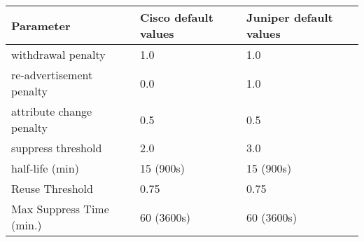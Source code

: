 \begin{center}
	\begin{tabular}{ || m{5cm} | m{4cm} | m{4cm} || }
	\hline
			Parameter & Cisco default values & Juniper default values\\
	\hline \hline
			withdrawal penalty & 1.0 & 1.0 \\
	\hline
			re-advertisement penalty & 0.0 & 1.0 \\
	\hline
			attribute change penalty & 0.5 & 0.5 \\
	\hline
			suppress threshold & 2.0 & 3.0\\
	\hline
			half-life (min) & 15 (900s) & 15 (900s)\\
	\hline
			Reuse Threshold & 0.75 & 0.75 \\
	\hline
			Max Suppress Time (min.) & 60 (3600s) & 60 (3600s)\\
	\hline
	\end{tabular}
\end{center}
